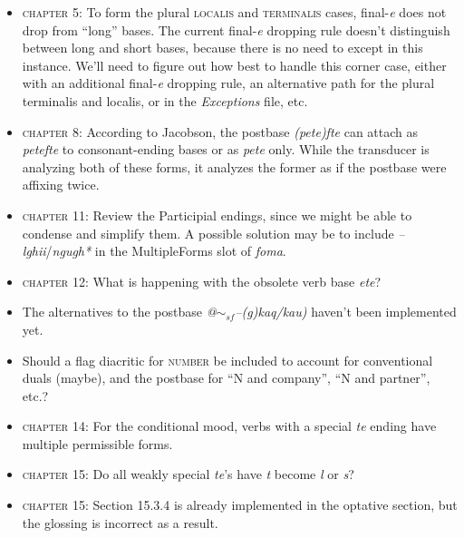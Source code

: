 \documentclass{article}
\begin{document}
\begin{itemize}
\renewcommand\labelitemi{$\cdot$}

\item \textsc{chapter 5}: To form the plural \textsc{localis} and \textsc{terminalis} cases, final-\textit{e} does not drop from ``long'' bases.
%
The current final-\textit{e} dropping rule doesn't distinguish between long and short bases, because there is no need to except in this instance.
%
We'll need to figure out how best to handle this corner case, either with an additional final-\textit{e} dropping rule, an alternative path for the plural terminalis and localis, or in the \textit{Exceptions} file, etc.

\item \textsc{chapter 8}: According to Jacobson, the postbase \textit{(pete)fte} can attach as \textit{petefte} to consonant-ending bases or as \textit{pete} only.
%
While the transducer is analyzing both of these forms, it analyzes the former as if the postbase were affixing twice.

\item \textsc{chapter 11}: Review the Participial endings, since we might be able to condense and simplify them.
%
A possible solution may be to include \textit{--lghii}/\textit{ngugh*} in the MultipleForms slot of \textit{foma}.

\item \textsc{chapter 12}: What is happening with the obsolete verb base \textit{ete}?

\item The alternatives to the postbase \textit{@$\sim_{sf}$--(g)kaq/kau)} haven't been implemented yet.

\item Should a flag diacritic for \textsc{number} be included to account for conventional duals (maybe), and the postbase for ``N and company'', ``N and partner'', etc.?

\item \textsc{chapter 14}: For the conditional mood, verbs with a special \textit{te} ending have multiple permissible forms.

\item \textsc{chapter 15}: Do all weakly special \textit{te}'s have \textit{t} become \textit{l} or \textit{s}?

\item \textsc{chapter 15}: Section 15.3.4 is already implemented in the optative section, but the glossing is incorrect as a result.


\end{itemize}
\end{document}
